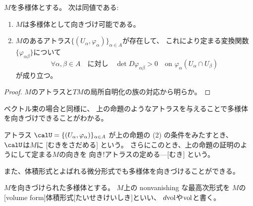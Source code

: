 \documentclass[report]{jlreq}
\begin{document}
\begin{proposition}[多様体の向きづけ可能性の特徴付け]
    $M$を多様体とする。
    次は同値である:
    \begin{enumerate}
        \item $M$は多様体として向きづけ可能である。
        \item $M$のあるアトラス$\{ (U_\alpha, \varphi_\alpha) \}_{\alpha \in A}$が存在して、
            これにより定まる変換関数$\{ \varphi_{\alpha\beta} \}$について
            \begin{equation}
                \forall \alpha, \beta \in A
                \quad \text{に対し} \quad
                \det D \varphi_{\alpha\beta} > 0
                \quad \text{on } \varphi_\alpha(U_\alpha \cap U_\beta)
            \end{equation}
            が成り立つ。
    \end{enumerate}
\end{proposition}

\begin{proof}
    $M$のアトラスと$TM$の局所自明化の族の対応から明らか。
\end{proof}

ベクトル束の場合と同様に、
上の命題のようなアトラスを与えることで多様体を向きづけできることがわかる。

\begin{definition}[アトラスが定める向き]
    アトラス
    $\calU = \{ (U_\alpha, \varphi_\alpha) \}_{\alpha \in A}$
    が上の命題の (2) の条件をみたすとき、
    $\calU$は$M$に
    [むきをさだめる]
    という。
    さらにこのとき、上の命題の証明のようにして定まる$M$の向きを
        {向き!アトラスの定める---}[むき]
    という。
\end{definition}

また、体積形式とよばれる微分形式でも多様体を向きづけることができる。

\begin{definition}[体積形式]
    $M$を向きづけられた多様体とする。
    $M$上の nonvanishing な最高次形式を
    $M$の[volume form]{体積形式}[たいせきけいしき]といい、
    $d\mathrm{vol}$や$\mathrm{vol}$と書く。
\end{definition}
\end{document}
